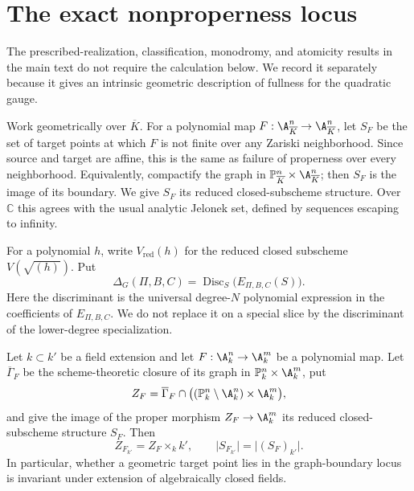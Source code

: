 \section{The exact nonproperness locus}
\label{app:nonproperness}

The prescribed-realization, classification, monodromy, and atomicity results
in the main text do not require the calculation below.  We
record it separately because it gives an intrinsic geometric description of
fullness for the quadratic gauge.

Work geometrically over
\(\overline K\).  For a polynomial map \(F:\A^n_{\overline K}\to
\A^n_{\overline K}\), let \(S_F\) be the set of target points at which \(F\)
is not finite over any Zariski neighborhood.  Since source and target are
affine, this is the same as failure of properness over every neighborhood.
Equivalently, compactify the graph in
\(\mathbb P^n_{\overline K}\times\A^n_{\overline K}\); then \(S_F\) is the
image of its boundary.  We give \(S_F\) its reduced closed-subscheme
structure.  Over \(\mathbb C\) this agrees with the usual analytic Jelonek
set, defined by sequences escaping to infinity.

For a polynomial \(h\), write \(V_{\mathrm{red}}(h)\) for the reduced closed
subscheme \(V(\sqrt{(h)})\).  Put
\begin{equation}
 \Delta_G(\Pi,B,C)
 =\operatorname{Disc}_S\bigl(E_{\Pi,B,C}(S)\bigr).
 \label{eq:gauge-discriminant}
\end{equation}
Here the discriminant is the universal degree-\(N\) polynomial expression in
the coefficients of \(E_{\Pi,B,C}\).  We do not replace it on a special
slice by the discriminant of the lower-degree specialization.

\begin{lemma}
\label{lem:nonfinite-base-change}
Let \(k\subset k'\) be a field extension and let
\(F:\A^n_k\to\A^m_k\) be a polynomial map.  Let \(\overline\Gamma_F\) be
the scheme-theoretic closure of its graph in
\(\mathbb P^n_k\times\A^m_k\), put
\[
 Z_F=\overline\Gamma_F\cap
 \bigl((\mathbb P^n_k\setminus\A^n_k)\times\A^m_k\bigr),
\]
and give the image of the proper morphism \(Z_F\to\A^m_k\) its reduced
closed-subscheme structure \(S_F\).  Then
\[
 Z_{F_{k'}}=Z_F\times_k k',
 \qquad
 \lvert S_{F_{k'}}\rvert=\lvert (S_F)_{k'}\rvert .
\]
In particular, whether a geometric target point lies in the graph-boundary
locus is invariant under extension of algebraically closed fields.
\end{lemma}

